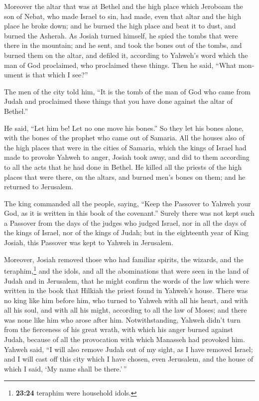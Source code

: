 \begin{paracol}{2}
\begin{otherlanguage}{english}
 Moreover the altar that was at Bethel and the high place
which Jeroboam the son of Nebat, who made Israel to sin, had made, even
that altar and the high place he broke down; and he burned the high
place and beat it to dust, and burned the Asherah.  As
Josiah turned himself, he spied the tombs that were there in the
mountain; and he sent, and took the bones out of the tombs, and burned
them on the altar, and defiled it, according to Yahweh's word which the
man of God proclaimed, who proclaimed these things.  Then
he said, ``What monument is that which I see?''

The men of the city told him, ``It is the tomb of the man of God who
came from Judah and proclaimed these things that you have done against
the altar of Bethel.''

 He said, ``Let him be! Let no one move his bones.'' So
they let his bones alone, with the bones of the prophet who came out of
Samaria.  All the houses also of the high places that
were in the cities of Samaria, which the kings of Israel had made to
provoke Yahweh to anger, Josiah took away, and did to them according to
all the acts that he had done in Bethel.  He killed all
the priests of the high places that were there, on the altars, and
burned men's bones on them; and he returned to Jerusalem.

 The king commanded all the people, saying, ``Keep the
Passover to Yahweh your God, as it is written in this book of the
covenant.''  Surely there was not kept such a Passover
from the days of the judges who judged Israel, nor in all the days of
the kings of Israel, nor of the kings of Judah;  but in
the eighteenth year of King Josiah, this Passover was kept to Yahweh in
Jerusalem.

 Moreover, Josiah removed those who had familiar spirits,
the wizards, and the teraphim,\footnote{\textbf{23:24} teraphim were
  household idols.} and the idols, and all the abominations that were
seen in the land of Judah and in Jerusalem, that he might confirm the
words of the law which were written in the book that Hilkiah the priest
found in Yahweh's house.  There was no king like him
before him, who turned to Yahweh with all his heart, and with all his
soul, and with all his might, according to all the law of Moses; and
there was none like him who arose after him. 
Notwithstanding, Yahweh didn't turn from the fierceness of his great
wrath, with which his anger burned against Judah, because of all the
provocation with which Manasseh had provoked him.  Yahweh
said, ``I will also remove Judah out of my sight, as I have removed
Israel; and I will cast off this city which I have chosen, even
Jerusalem, and the house of which I said, `My name shall be there.'\,''


\end{otherlanguage}
\end{paracol}
